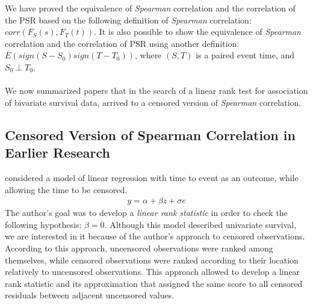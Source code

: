 \documentclass[]{article}
\begin{document}
We have proved the equivalence of \emph{Spearman} correlation and the correlation of the PSR based on the following definition of \emph{Spearman} correlation: $corr(F_S(s), F_T(t))$. It is also possible to show the equivalence of \emph{Spearman} correlation and the correlation of PSR using another definition: $E(sign(S-S_0)sign(T-T_0))$, where $(S,T)$ is a paired event time, and $S_0 \perp T_0$.\\
~\\
We now summarized papers that in the search of a linear rank test for association of bivariate survival data, arrived to a censored version of \emph{Spearman} correlation. 


\subsection{Censored Version of Spearman Correlation in Earlier Research}

\cite{prentice1978linear} considered a model of linear regression with time to event as an outcome, while allowing the time to be censored.
	$$
	\begin{aligned}
		y = \alpha + \beta z + \sigma e
	\end{aligned}
	$$
The author's goal was to develop a \emph{linear rank statistic} in order to check the following hypothesis: $\beta = 0$. Although this model described univariate survival, we are interested in it because of the author's approach to censored observations. 
According to this approach, uncensored observations were ranked among themselves, while censored observations were ranked according to their location relatively to uncensored observations. This approach allowed to develop a linear rank statistic and its approximation that assigned the same score to all censored residuals between adjacent uncensored values.\\
~\\
\end{document}
